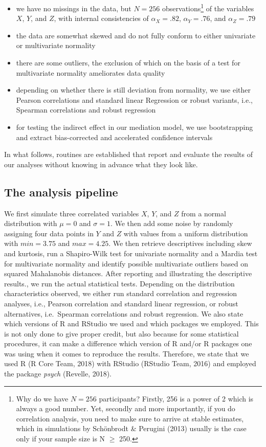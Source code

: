 \documentclass[
]{article}
\providecommand{\tightlist}{%
  \setlength{\itemsep}{0pt}\setlength{\parskip}{0pt}}
\begin{document}
\begin{itemize}
\tightlist
\item
  we have no missings in the data, but \(N=256\) observations\footnote{Why
    do we have \(N=256\) participants? Firstly, 256 is a power of 2
    which is always a good number. Yet, secondly and more importantly,
    if you do correlation analysis, you need to make sure to arrive at
    stable estimates, which in simulations by Schönbrodt \& Perugini
    (2013) usually is the case only if your sample size is N \(\ge\)
    250.} of the variables \(X\), \(Y\), and \(Z\), with internal
  consistencies of \(\alpha_{X}=.82\), \(\alpha_{Y}=.76\), and
  \(\alpha_{Z}=.79\)
\item
  the data are somewhat skewed and do not fully conform to either
  univariate or multivariate normality
\item
  there are some outliers, the exclusion of which on the basis of a test
  for multivariate normality ameliorates data quality
\item
  depending on whether there is still deviation from normality, we use
  either Pearson correlations and standard linear Regression or robust
  variants, i.e., Spearman correlations and robust regression
\item
  for testing the indirect effect in our mediation model, we use
  bootstrapping and extract bias-corrected and accelerated confidence
  intervals
\end{itemize}

In what follows, routines are established that report and evaluate the
results of our analyses without knowing in advance what they look like.

\hypertarget{the-analysis-pipeline}{%
\subsection{The analysis pipeline}\label{the-analysis-pipeline}}

We first simulate three correlated variables \(X\), \(Y\), and \(Z\)
from a normal distribution with \(\mu=0\) and \(\sigma=1\). We then add
some noise by randomly assigning four data points in \(Y\) and \(Z\)
with values from a uniform distribution with \(min=3.75\) and
\(max=4.25\). We then retrieve descriptives including skew and kurtosis,
run a Shapiro-Wilk test for univariate normality and a Mardia test for
multivariate normality and identify possible multivariate outliers based
on squared Mahalanobis distances. After reporting and illustrating the
descriptive results., we run the actual statistical tests. Depending on
the distribution characteristics observed, we either run standard
correlation and regression analyses, i.e., Pearson correlation and
standard linear regression, or robust alternatives, i.e.~Spearman
correlations and robust regression. We also state which versions of R
and RStudio we used and which packages we employed. This is not only
done to give proper credit, but also because for some statistical
procedures, it can make a difference which version of R and/or R
packages one was using when it comes to reproduce the results.
Therefore, we state that we used R (R Core Team, 2018) with RStudio
(RStudio Team, 2016) and employed the package \emph{psych} (Revelle,
2018).
\end{document}
